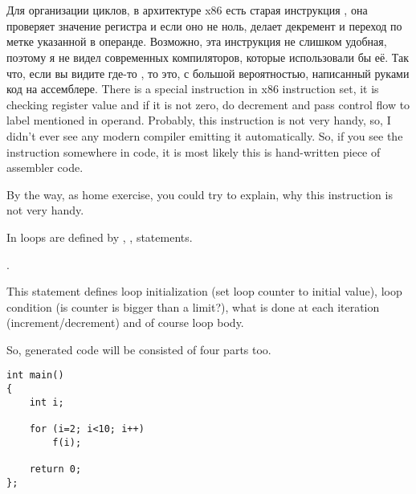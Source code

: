 ﻿%

\section{}

\IFRU
{Для организации циклов, в архитектуре x86 есть старая инструкция \LOOP, 
она проверяет значение регистра \ECX и если оно не ноль, делает декремент \ECX и переход 
по метке указанной в операнде. 
Возможно, эта инструкция не слишком удобная, поэтому я не видел современных компиляторов, 
которые использовали бы её. Так что, если вы видите где-то \LOOP, то это, с большой вероятностью, 
написанный руками код на ассемблере.}
{There is a special \LOOP instruction in x86 instruction set, it is checking \ECX register value and 
if it is not zero, do \ECX decrement and pass control flow to label mentioned in \LOOP operand. 
Probably, this instruction is not very handy, so, I didn't ever see any modern compiler emitting it automatically. 
So, if you see the instruction somewhere in code, it is most likely this is hand-written piece of assembler code.}

{By the way, as home exercise, you could try to explain, why this instruction is not very handy.}

{In \CCpp loops are defined by , ,  statements.}

 .

{This statement defines loop initialization (set loop counter to initial value), 
loop condition (is counter is bigger than a limit?), what is done at each iteration (increment/decrement) 
and of course loop body.}

\IFRU{}{}

{So, generated code will be consisted of four parts too.}


\begin{lstlisting}
int main()
{
	int i;

	for (i=2; i<10; i++)
		f(i);

	return 0;
};
\end{lstlisting}

